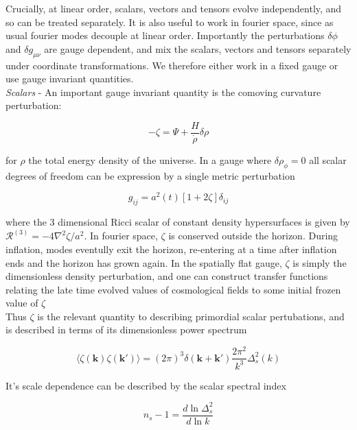 \documentclass[a4paper,10pt]{article}
\renewcommand{\v}[1]{\mathbf{#1}}
\begin{document}
Crucially, at linear order, scalars, vectors and tensors evolve independently, and so can be treated separately. It is also useful to work in fourier space, since as usual fourier modes decouple at linear order. Importantly the perturbations $\delta\phi$ and $\delta g_{\mu\nu}$ are gauge dependent, and mix the scalars, vectors and tensors separately 
under coordinate transformations. We therefore either work in a fixed gauge or use gauge invariant quantities.\\

\textit{Scalars} - An important gauge invariant quantity is the comoving curvature perturbation:

\begin{equation}
-\zeta = \Psi + \frac{H}{\dot\rho}\delta{\rho} 
\label{zeta}
\end{equation}

for $\rho$ the total energy density of the universe. In a gauge where $\delta{\rho}_\phi = 0$ all scalar degrees of freedom can be expression by a single metric perturbation 

\begin{equation}
g_{ij} = a^2(t)[1+2\zeta]\delta_{ij}
\end{equation}

where the 3 dimensional Ricci scalar of constant density hypersurfaces is given by $\mathcal{R}^{(3)} = -4\nabla^2\zeta / a^2$. In fourier space, $\zeta$ is conserved outside the horizon. During inflation, modes eventully exit the horizon, re-entering at a time after inflation ends and the horizon has grown again. In the spatially flat gauge, $\zeta$ is simply the dimensionless density perturbation, and one can construct transfer functions relating the late time evolved values of cosmological fields to some initial frozen value of $\zeta$ \\

Thus $\zeta$ is the relevant quantity to describing primordial scalar pertubations, and is described in terms of its dimensionless power spectrum

\begin{equation}
\langle \zeta(\v{k})\zeta(\v{k'}) \rangle=(2\pi)^3\delta(\v{k}+\v{k'})\frac{2\pi^2}{k^3}\Delta^2_s(k)
\end{equation}

It's scale dependence can be described by the scalar spectral index

\begin{equation}
n_s-1 = \frac{d\ln{\Delta^2_s}}{d\ln{k}}
\end{equation}
\end{document}
